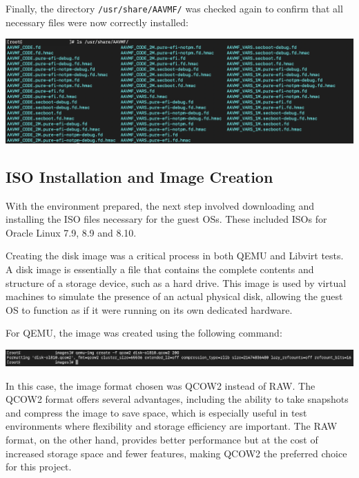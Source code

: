 Finally, the directory \texttt{/usr/share/AAVMF/} was checked again to confirm that all necessary files were now correctly installed:

\begin{center}
    \centering
    \includegraphics[width=\textwidth]{Images/AAVMF Files.png}
    \label{fig:casa}
\end{center}

\subsection{ISO Installation and Image Creation}

With the environment prepared, the next step involved downloading and installing the ISO files necessary for the guest OSs. These included ISOs for Oracle Linux 7.9, 8.9 and 8.10.\mynewline

Creating the disk image was a critical process in both QEMU and Libvirt tests. A disk image is essentially a file that contains the complete contents and structure of a storage device, such as a hard drive. This image is used by virtual machines to simulate the presence of an actual physical disk, allowing the guest OS to function as if it were running on its own dedicated hardware.\mynewline

For QEMU, the image was created using the following command:

\begin{center}
    \centering
    \includegraphics[width=\textwidth]{Images/Disk Image Creation QEMU.png}
    \label{fig:casa}
\end{center}

In this case, the image format chosen was QCOW2 instead of RAW. The QCOW2 format offers several advantages, including the ability to take snapshots and compress the image to save space, which is especially useful in test environments where flexibility and storage efficiency are important. The RAW format, on the other hand, provides better performance but at the cost of increased storage space and fewer features, making QCOW2 the preferred choice for this project.\mynewline

